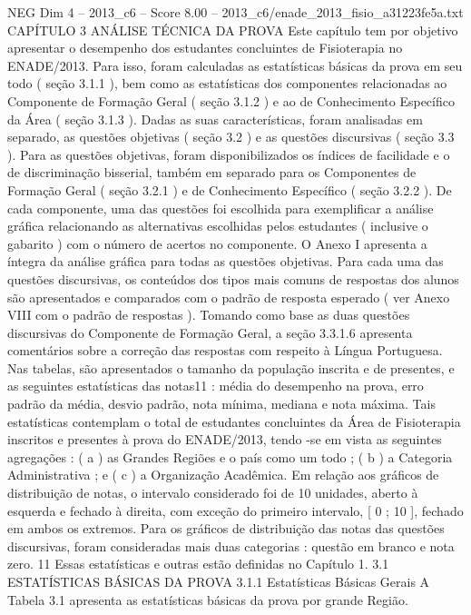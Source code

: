 \begin{textsample}{NEG Dim 4 – 2013\_c6 – Score 8.00 – 2013\_c6/enade\_2013\_fisio\_a31223fe5a.txt}  \label{ex:f4_neg_311}
CAPÍTULO 3 ANÁLISE TÉCNICA DA PROVA Este capítulo tem por objetivo apresentar o desempenho dos estudantes concluintes de Fisioterapia no ENADE/2013.
Para isso, foram calculadas as estatísticas básicas da prova em seu todo ( seção 3.1.1 ), bem como as estatísticas dos componentes relacionadas ao Componente de Formação Geral ( seção 3.1.2 ) e ao de Conhecimento Específico da Área ( seção 3.1.3 ).
Dadas as suas características, foram analisadas em separado, as questões objetivas ( seção 3.2 ) e as questões discursivas ( seção 3.3 ).
Para as questões objetivas, foram disponibilizados os índices de facilidade e o de discriminação bisserial, também em separado para os Componentes de Formação Geral ( seção 3.2.1 ) e de Conhecimento Específico ( seção 3.2.2 ).
De cada componente, uma das questões foi escolhida para exemplificar a análise gráfica relacionando as alternativas escolhidas pelos estudantes ( inclusive o gabarito ) com o número de acertos no componente.
O Anexo I apresenta a íntegra da análise gráfica para todas as questões objetivas.
Para cada uma das questões discursivas, os conteúdos dos tipos mais comuns de respostas dos alunos são apresentados e comparados com o padrão de resposta esperado ( ver Anexo VIII com o padrão de respostas ).
Tomando como base as duas questões discursivas do Componente de Formação Geral, a seção 3.3.1.6 apresenta comentários sobre a correção das respostas com respeito à Língua Portuguesa.
Nas tabelas, são apresentados o tamanho da população inscrita e de presentes, e as seguintes estatísticas das notas11 : média do desempenho na prova, erro padrão da média, desvio padrão, nota mínima, mediana e nota máxima.
Tais estatísticas contemplam o total de estudantes concluintes da Área de Fisioterapia inscritos e presentes à prova do ENADE/2013, tendo -se em vista as seguintes agregações : ( a ) as Grandes Regiões e o país como um todo ; ( b ) a Categoria Administrativa ; e ( c ) a Organização Acadêmica.
Em relação aos gráficos de distribuição de notas, o intervalo considerado foi de 10 unidades, aberto à esquerda e fechado à direita, com exceção do primeiro intervalo, [ 0 ; 10 ], fechado em ambos os extremos.
Para os gráficos de distribuição das notas das questões discursivas, foram consideradas mais duas categorias : questão em branco e nota zero. 11 Essas estatísticas e outras estão definidas no Capítulo 1. 3.1 ESTATÍSTICAS BÁSICAS DA PROVA 3.1.1 Estatísticas Básicas Gerais A Tabela 3.1 apresenta as estatísticas básicas da prova por grande Região.

\end{textsample}
